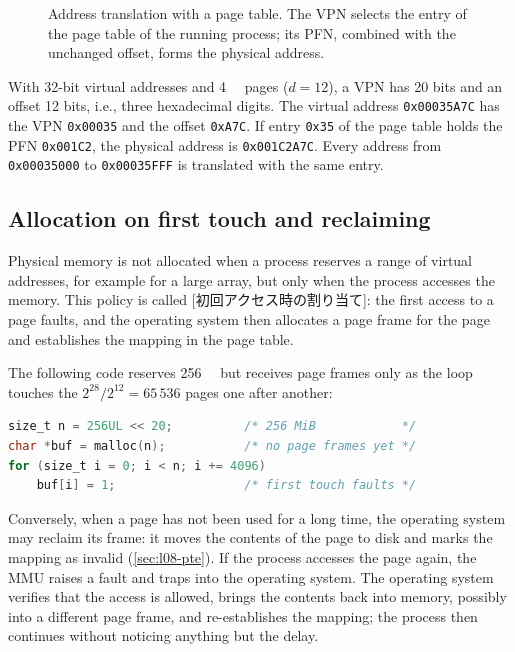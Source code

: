 \documentclass[../main.tex]{subfiles}
\begin{document}
\begin{figure}[htbp]
  \centering
  
  \caption{Address translation with a page table.  The VPN selects the
    entry of the page table of the running process; its PFN, combined with
    the unchanged offset, forms the physical address.}
  \label{fig:l08-translation}
\end{figure}

\begin{example}
  With 32-bit virtual addresses and \SI{4}{\kibi\byte} pages ($d = 12$), a
  VPN has 20 bits and an offset 12 bits, i.e., three hexadecimal digits.
  The virtual address \texttt{0x00035A7C} has the VPN \texttt{0x00035} and
  the offset \texttt{0xA7C}.  If entry \texttt{0x35} of the page table holds
  the PFN \texttt{0x001C2}, the physical address is \texttt{0x001C2A7C}.
  Every address from \texttt{0x00035000} to \texttt{0x00035FFF} is
  translated with the same entry.
\end{example}

\subsection{Allocation on first touch and reclaiming}

Physical memory is not allocated when a process reserves a range of virtual
addresses, for example for a large array, but only when the process
accesses the memory.  This policy is called
[初回アクセス時の割り当て]: the first
access to a page faults, and the operating system then allocates a page
frame for the page and establishes the mapping in the page table.

\begin{example}
  The following code reserves \SI{256}{\mebi\byte} but receives page frames
  only as the loop touches the $2^{28}/2^{12} = 65\,536$ pages one after
  another:
  \begin{lstlisting}[language=C, numbers=none]
size_t n = 256UL << 20;          /* 256 MiB            */
char *buf = malloc(n);           /* no page frames yet */
for (size_t i = 0; i < n; i += 4096)
    buf[i] = 1;                  /* first touch faults */
\end{lstlisting}
\end{example}

Conversely, when a page has not been used for a long time, the operating
system may reclaim its frame: it moves the contents of the page to disk and
marks the mapping as invalid (\cref{sec:l08-pte}).  If the process accesses
the page again, the MMU raises a fault and traps into the operating system.
The operating system verifies that the access is allowed, brings the
contents back into memory, possibly into a different page frame, and
re-establishes the mapping; the process then continues without noticing
anything but the delay.
\end{document}
